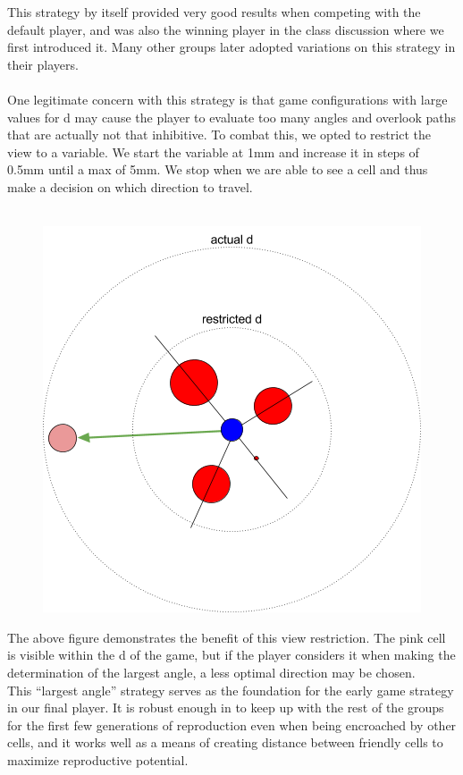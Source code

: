 This strategy by itself provided very good results when competing with the default player, and was also the winning player in the class discussion where we first introduced it. Many other groups later adopted variations on this strategy in their players.\\
\\

One legitimate concern with this strategy is that game configurations with large values for d may cause the player to evaluate too many angles and overlook paths that are actually not that inhibitive. To combat this, we opted to restrict the view to a variable. We start the variable at 1mm and increase it in steps of 0.5mm until a max of 5mm. We stop when we are able to see a cell and thus make a decision on which direction to travel.\\
\\

\begin{figure}[h]
\center
\includegraphics[scale=1]{angle2.png}
\caption{}
\label{fig:angle2}
\end{figure}
The above figure demonstrates the benefit of this view restriction. The pink cell is visible within the d of the game, but if the player considers it when making the determination of the largest angle, a less optimal direction may be chosen.\\
This “largest angle” strategy serves as the foundation for the early game strategy in our final player. It is robust enough in to keep up with the rest of the groups for the first few generations of reproduction even when being encroached by other cells, and it works well as a means of creating distance between friendly cells to maximize reproductive potential.\\

